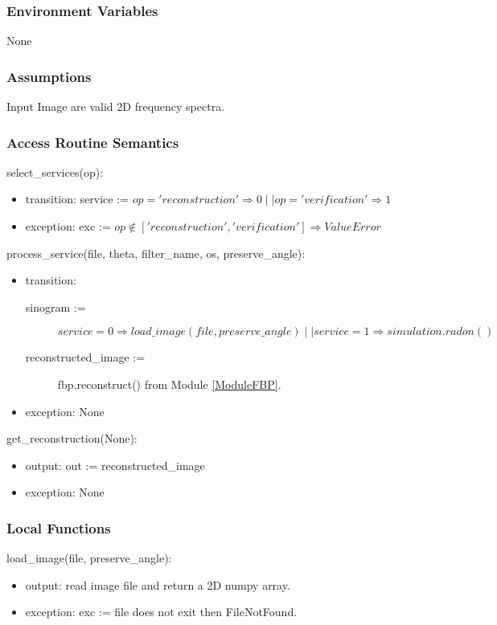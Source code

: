 \documentclass[12pt, titlepage]{article}
\begin{document}
\subsubsection{Environment Variables}
None

\subsubsection{Assumptions}
Input Image are valid 2D frequency spectra.

\subsubsection{Access Routine Semantics}

\noindent
select\_services(op):
\begin{itemize}
\item transition:  service := \(op ='reconstruction' \Rightarrow  0 \mid\mid op = 'verification' \Rightarrow  1\)
\item exception: exc := \(op \notin ['reconstruction', 'verification'] \Rightarrow ValueError\)
\end{itemize}

\noindent
process\_service(file, theta, filter\_name, os, preserve\_angle):
\begin{itemize}
\item transition:
  \begin{description}
  \item[sinogram :=] \(service = 0 \Rightarrow load\_image(file, preserve\_angle) \mid\mid
    service = 1 \Rightarrow simulation.radon()\)
  \item[reconstructed\_image :=] fbp.reconstruct() from Module \ref{ModuleFBP}.
  \end{description}
\item exception: None
\end{itemize}

\noindent
get\_reconstruction(None):
\begin{itemize}
\item output: out := reconstructed\_image
\item exception: None
\end{itemize}
\subsubsection{Local Functions}
\noindent
load\_image(file, preserve\_angle):
\begin{itemize}
\item output: read image file and return a 2D numpy array.
\item exception: exc := file does not exit then FileNotFound.
\end{itemize}
\end{document}
